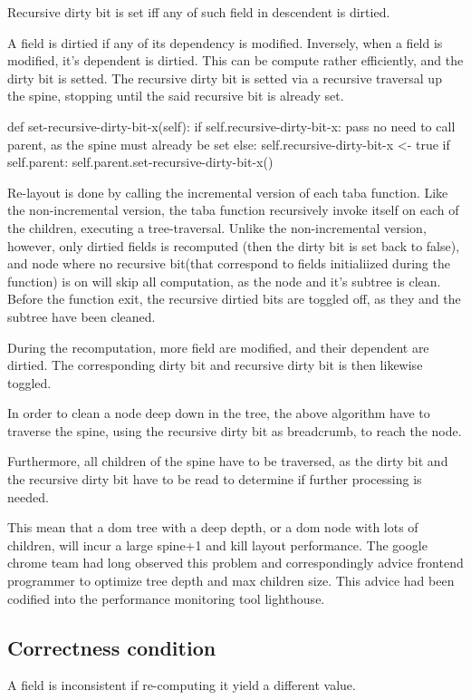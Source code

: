 \documentclass[format=acmsmall, review=false, screen=true]{acmart}
\begin{document}
Recursive dirty bit is set iff any of such field in descendent is dirtied.

A field is dirtied if any of its dependency is modified. Inversely, when a field is modified, it's dependent is dirtied. This can be compute rather efficiently, and the dirty bit is setted. The recursive dirty bit is setted via a recursive traversal up the spine, stopping until the said recursive bit is already set.

def set-recursive-dirty-bit-x(self):
if self.recursive-dirty-bit-x:
pass no need to call parent, as the spine must already be set
else:
self.recursive-dirty-bit-x <- true
if self.parent:
self.parent.set-recursive-dirty-bit-x()

Re-layout is done by calling the incremental version of each taba function. Like the non-incremental version, the taba function recursively invoke itself on each of the children, executing a tree-traversal. Unlike the non-incremental version, however, only dirtied fields is recomputed (then the dirty bit is set back to false), and node where no recursive bit(that correspond to fields initialiized during the function) is on will skip all computation, as the node and it's subtree is clean. Before the function exit, the recursive dirtied bits are toggled off, as they and the subtree have been cleaned.

During the recomputation, more field are modified, and their dependent are dirtied. The corresponding dirty bit and recursive dirty bit is then likewise toggled.

In order to clean a node deep down in the tree, the above algorithm have to traverse the spine, using the recursive dirty bit as breadcrumb, to reach the node.

Furthermore, all children of the spine have to be traversed, as the dirty bit and the recursive dirty bit have to be read to determine if further processing is needed.

This mean that a dom tree with a deep depth, or a dom node with lots of children, will incur a large spine+1 and kill layout performance. The google chrome team had long observed this problem and correspondingly advice frontend programmer to optimize tree depth and max children size. This advice had been codified into the performance monitoring tool lighthouse.

\subsection{Correctness condition}
A field is inconsistent if re-computing it yield a different value.
\end{document}
